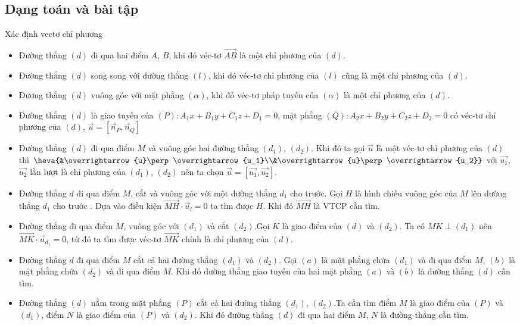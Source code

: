  \subsection{Dạng toán và bài tập}
	\begin{dang}{Xác định vectơ chỉ phương}%
		\begin{itemize}
			\item Đường thẳng $(d)$ đi qua hai điểm $A$, $B$, khi đó véc-tơ $\overrightarrow{AB}$ là một chỉ phương của $(d)$.
			\item Đường thẳng $(d)$ song song với đường thẳng $(l)$, khi đó véc-tơ chỉ phương của $(l)$ cũng là một chỉ phương của $(d)$.
			\item Đương thẳng $(d)$ vuông góc với mặt phẳng $(\alpha)$, khi đó véc-tơ pháp tuyến của $(\alpha)$ là một chỉ phương của $(d)$.
			\item Đường thẳng $(d)$ là giao tuyến của $(P)\colon A_1x+B_1y+C_1z+D_1=0$, mặt phẳng $(Q)\colon A_2x+B_2y+C_2z+D_2=0$ có véc-tơ chỉ phương của $(d)$, $\overrightarrow{u}=\left[\overrightarrow{n}_{P},\overrightarrow{n}_{Q}\right] $
			\item Đường thẳng $(d)$ đi qua điểm $M$ và vuông góc hai đường thẳng $(d_1)$, $(d_2)$. Khi đó ta gọi $\overrightarrow{u}$ là một véc-tơ chỉ phương của $(d)$ thì $\heva{&\overrightarrow{u}\perp\overrightarrow{u_1}\\&\overrightarrow{u}\perp\overrightarrow{u_2}}$ với $\overrightarrow{u_1}$, $\overrightarrow{u_2}$ lần lượt là chỉ phương của $(d_1)$, $(d_2)$ nên ta chọn $\overrightarrow{u}=\left[ \overrightarrow{u_1},\overrightarrow{u_2}\right] $.
			\item Đường thẳng $d$ đi qua điểm $M$, cắt và vuông góc với một đường thẳng $d_1$ cho trước. Gọi $H$ là hình chiếu vuông góc của $M$ lên đường thẳng $d_1$ cho trước . Dựa vào điều kiện $\overrightarrow{MH}\cdot\overrightarrow{u}_{l}=0$ ta tìm được $H$. Khi đó $\overrightarrow{MH} $ là  VTCP cần tìm.
			\item Đường thẳng đi qua điểm $M$, vuông góc với $(d_1)$ và cắt $(d_2)$.Gọi $K$ là giao điểm của $(d)$ và $(d_2)$. Ta có $MK\perp (d_1)$ nên $\overrightarrow{MK}\cdot\overrightarrow{u}_{d_1}=0$, từ đó ta tìm được véc-tơ $\overrightarrow{MK}$ chính là chỉ phương của $(d)$.
			\item Đường thẳng  $d$ đi qua điểm $M$ cắt cả hai đường thẳng $(d_1)$ và $(d_2)$.	Gọi $(a)$ là mặt phẳng chứa $(d_1)$ và đi qua điểm $M$, $(b)$ là mặt phẳng chứa $(d_2)$ và đi qua điểm $M$. Khi đó đường thẳng giao tuyến của hai mặt phẳng $(a)$ và $(b)$ là đường thẳng $(d)$ cần tìm.
			\item Đường thẳng $(d)$ nằm trong mặt phẳng $(P)$ cắt cả hai đường thẳng $(d_1)$, $(d_2)$.Ta cần tìm điểm $M$ là giao điểm của $(P)$ và $(d_1)$, điểm $N$ là giao điểm của $(P)$ và $(d_2)$. Khi đó đường thẳng $(d)$ đi qua hai điểm $M$, $N$ là đường thẳng cần tìm.
			\end{itemize}
	\end{dang}
